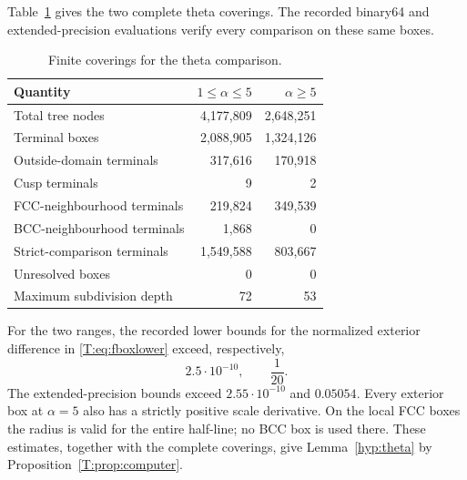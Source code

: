 \documentclass[reqno,english]{amsart}
\theoremstyle{definition}
\newtheorem{open problem}[theorem]{Open Problem}
\theoremstyle{remark}
\theoremstyle{plain}
\numberwithin{equation}{section}
\begin{document}
Table~\ref{T:tab:trees} gives the two complete theta coverings. The
recorded binary64 and extended-precision evaluations verify every
comparison on these same boxes.

\begin{table}[!htbp]
\centering
\caption{Finite coverings for the theta comparison.}\label{T:tab:trees}
\begin{tabular}{@{}lrr@{}}
\toprule
Quantity & $1\le\alpha\le5$ & $\alpha\ge5$\\
\midrule
Total tree nodes & 4,177,809 & 2,648,251\\
Terminal boxes & 2,088,905 & 1,324,126\\
Outside-domain terminals & 317,616 & 170,918\\
Cusp terminals & 9 & 2\\
FCC-neighbourhood terminals & 219,824 & 349,539\\
BCC-neighbourhood terminals & 1,868 & 0\\
Strict-comparison terminals & 1,549,588 & 803,667\\
Unresolved boxes & 0 & 0\\
Maximum subdivision depth & 72 & 53\\
\bottomrule
\end{tabular}
\end{table}

For the two ranges, the recorded lower bounds for the normalized
exterior difference in \eqref{T:eq:fboxlower} exceed, respectively,
\begin{equation}\label{T:eq:certmargins}
 2.5\cdot10^{-10},\qquad \frac1{20}.
\end{equation}
The extended-precision bounds exceed $2.55\cdot10^{-10}$ and
$0.05054$. Every exterior box at $\alpha=5$ also has a strictly
positive scale derivative. On the local FCC boxes the radius is valid
for the entire half-line; no BCC box is used there. These estimates,
together with the complete coverings, give
Lemma~\ref{hyp:theta} by Proposition~\ref{T:prop:computer}.
\end{document}
